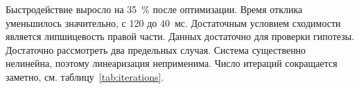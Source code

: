 Быстродействие выросло на 35~\% после оптимизации.
Время отклика уменьшилось значительно,
с 120 до 40~мс.
Достаточным условием сходимости является липшицевость правой части.
Данных достаточно для проверки гипотезы.
Достаточно рассмотреть два предельных случая.
Система существенно нелинейна, поэтому линеаризация неприменима.
Число итераций сокращается заметно, см. таблицу~\ref{tab:iterations}.

